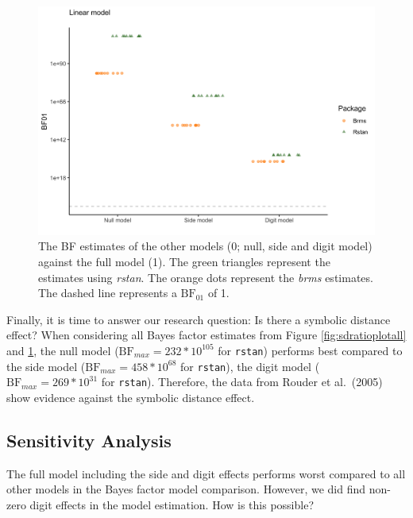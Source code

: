 \documentclass[
  english,
  doc,floatsintext]{apa6}
\begin{document}
\begin{figure}[H]

\includegraphics[width=0.7\linewidth]{I - Images/Fig18_normalbfplot01} \hfill{}

\caption{The BF estimates of the other models (0; null, side and digit model) against the full model (1). The green triangles represent the estimates using \textit{rstan}. The orange dots represent the \textit{brms} estimates. The dashed line represents a $\text{BF}_{01}$ of 1. }\label{fig:bsbfestimatesbrmsrstan}
\end{figure}

Finally, it is time to answer our research question: Is there a symbolic distance effect? When considering all Bayes factor estimates from Figure \ref{fig:sdratioplotall} and \ref{fig:bsbfestimatesbrmsrstan}, the null model (\(\text{BF}_{max} = 232 * 10^{105}\) for \texttt{rstan}) performs best compared to the side model (\(\text{BF}_{max} = 458 * 10^{68}\) for \texttt{rstan}), the digit model (\(\text{BF}_{max} = 269 * 10^{31}\) for \texttt{rstan}). Therefore, the data from Rouder et al.~(2005) show evidence against the symbolic distance effect.

\hypertarget{sensitivity-analysis}{%
\subsection{Sensitivity Analysis}\label{sensitivity-analysis}}

The full model including the side and digit effects performs worst compared to all other models in the Bayes factor model comparison. However, we did find non-zero digit effects in the model estimation. How is this possible?
\end{document}
